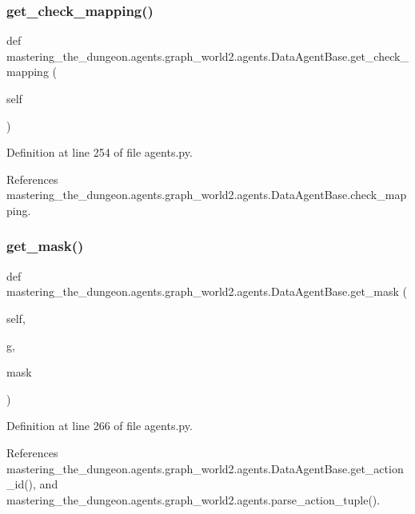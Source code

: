 \subsubsection{\texorpdfstring{get\+\_\+check\+\_\+mapping()}{get\_check\_mapping()}}
{\footnotesize\ttfamily def mastering\+\_\+the\+\_\+dungeon.\+agents.\+graph\+\_\+world2.\+agents.\+Data\+Agent\+Base.\+get\+\_\+check\+\_\+mapping (\begin{DoxyParamCaption}\item[{}]{self }\end{DoxyParamCaption})}



Definition at line 254 of file agents.\+py.



References mastering\+\_\+the\+\_\+dungeon.\+agents.\+graph\+\_\+world2.\+agents.\+Data\+Agent\+Base.\+check\+\_\+mapping.

\mbox{\label{classmastering__the__dungeon_1_1agents_1_1graph__world2_1_1agents_1_1DataAgentBase_a2c86aae45d19fdc0bcc72df70398db8d}} 
\subsubsection{\texorpdfstring{get\+\_\+mask()}{get\_mask()}}
{\footnotesize\ttfamily def mastering\+\_\+the\+\_\+dungeon.\+agents.\+graph\+\_\+world2.\+agents.\+Data\+Agent\+Base.\+get\+\_\+mask (\begin{DoxyParamCaption}\item[{}]{self,  }\item[{}]{g,  }\item[{}]{mask }\end{DoxyParamCaption})}



Definition at line 266 of file agents.\+py.



References mastering\+\_\+the\+\_\+dungeon.\+agents.\+graph\+\_\+world2.\+agents.\+Data\+Agent\+Base.\+get\+\_\+action\+\_\+id(), and mastering\+\_\+the\+\_\+dungeon.\+agents.\+graph\+\_\+world2.\+agents.\+parse\+\_\+action\+\_\+tuple().



